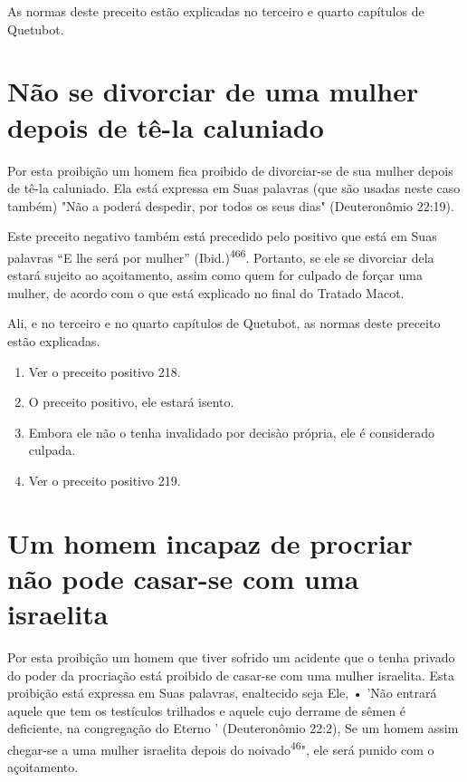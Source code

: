 As normas deste preceito estão explicadas no terceiro e quarto
capí­tulos de Quetubot.

\section{Não se divorciar de uma mulher depois de tê-la caluniado}

Por esta proibição um homem fica proibido de divorciar-se de sua mulher
depois de tê-la caluniado. Ela está expressa em Suas palavras (que são
usadas neste caso também) "Não a poderá despedir, por todos os seus
dias" (Deuteronômio 22:19).

Este preceito negativo também está precedido pelo positivo que es­tá em
Suas palavras ``E lhe será por mulher'' (Ibid.)\textsuperscript{466}.
Portanto, se ele se di­vorciar dela estará sujeito ao açoitamento, assim
como quem for culpado de forçar uma mulher, de acordo com o que está
explicado no final do Tratado Macot.

Ali, e no terceiro e no quarto capítulos de Quetubot, as normas des­te
preceito estão explicadas.


\begin{enumerate}
\def\labelenumi{\arabic{enumi}.}
\setcounter{enumi}{462}
\item
 
 Ver o preceito positivo 218.
 
\item
 
 O preceito positivo, ele estará isento.
 
\item
 
 Embora ele não o tenha invalidado por decisào própria, ele é
 considerado culpada.
 
\item
 
 Ver o preceito positivo 219.
 
\end{enumerate}



\section{Um homem incapaz de procriar não pode casar-se com uma israelita}

Por esta proibição um homem que tiver sofrido um acidente que o tenha
privado do poder da procriação está proibido de casar-se com uma mu­lher
israelita. Esta proibição está expressa em Suas palavras, enaltecido
seja Ele, • 'Não entrará aquele que tem os testículos trilhados e aquele
cujo derrame de sêmen é deficiente, na congregação do Eterno '
(Deuteronômio 22:2), Se um homem assim chegar-se a uma mulher israelita
depois do noivado\textsuperscript{46}", ele será punido com o
açoitamento.


